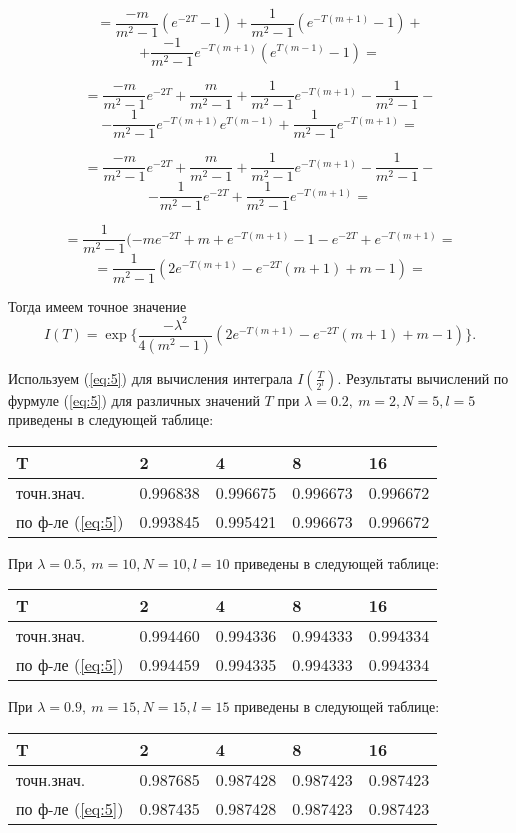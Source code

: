 \documentclass [12pt]{report}
\begin{document}
$$
= \frac{-m}{m^2-1} (e^{-2T} - 1) +
\frac{1}{m^2-1} ( e^{-T(m+1)} - 1) +
$$
$$
+ \frac{-1}{m^2-1} e^{-T(m+1)} (e^{T(m-1)} - 1) =
$$

$$
= \frac{-m}{m^2-1} e^{-2T} + \frac{m}{m^2-1} +
\frac{1}{m^2-1} e^{-T(m+1)} - \frac{1}{m^2-1} -
$$
$$
- \frac{1}{m^2-1} e^{-T(m+1)} e^{T(m-1)} + \frac{1}{m^2-1} e^{-T(m+1)} =
$$

$$
= \frac{-m}{m^2-1} e^{-2T} + \frac{m}{m^2-1} +
\frac{1}{m^2-1} e^{-T(m+1)} - \frac{1}{m^2-1} -
$$
$$
- \frac{1}{m^2-1} e^{-2T} + \frac{1}{m^2-1} e^{-T(m+1)} =
$$

$$
= \frac{1}{m^2-1}( -m e^{-2T} + m +
e^{-T(m+1)} - 1 - e^{-2T} + e^{-T(m+1)} =
$$
$$
= \frac{1}{m^2-1}( 2e^{-T(m+1)} - e^{-2T} (m + 1) + m - 1) =
$$

\noindent Тогда имеем точное значение
$$
I(T) = \exp\{ \frac{- \lambda^2}{4(m^2-1)}
( 2e^{-T(m+1)} - e^{-2T} (m + 1) + m - 1) \}.
$$

\vspace{1cm}

Используем (\ref{eq:5}) для вычисления интеграла $I(\frac{T}{2^l})$.
Результаты вычислений по фурмуле (\ref{eq:5}) для
различных значений $T$ при $\lambda=0.2,~m=2, N=5, l=5$
приведены в следующей таблице:

\begin{center}
\begin{tabular}{ | m{3cm} | m{2cm}| m{2cm} | m{2cm} | m{2cm} | }
\hline
 T & 2 & 4 & 8 & 16 \\
\hline
 точн.знач. & 0.996838 & 0.996675 & 0.996673 & 0.996672 \\
 по ф-ле (\ref{eq:5}) & 0.993845 & 0.995421 & 0.996673 & 0.996672 \\
\hline
\end{tabular}
\end{center}

\noindent При $\lambda=0.5,~m=10, N=10, l=10$
приведены в следующей таблице:
\begin{center}
\begin{tabular}{ | m{3cm} | m{2cm}| m{2cm} | m{2cm} | m{2cm} | }
\hline
 T & 2 & 4 & 8 & 16 \\
\hline
 точн.знач. & 0.994460 & 0.994336 & 0.994333 & 0.994334 \\
 по ф-ле (\ref{eq:5}) & 0.994459 & 0.994335 & 0.994333 & 0.994334 \\
\hline
\end{tabular}
\end{center}

\noindent При $\lambda=0.9,~m=15, N=15, l=15$
приведены в следующей таблице:
\begin{center}
\begin{tabular}{ | m{3cm} | m{2cm}| m{2cm} | m{2cm} | m{2cm} | }
\hline
 T & 2 & 4 & 8 & 16 \\
\hline
 точн.знач. & 0.987685 & 0.987428 & 0.987423 & 0.987423 \\
 по ф-ле (\ref{eq:5}) & 0.987435 & 0.987428 & 0.987423 & 0.987423 \\
\hline
\end{tabular}
\end{center}
\end{document}
